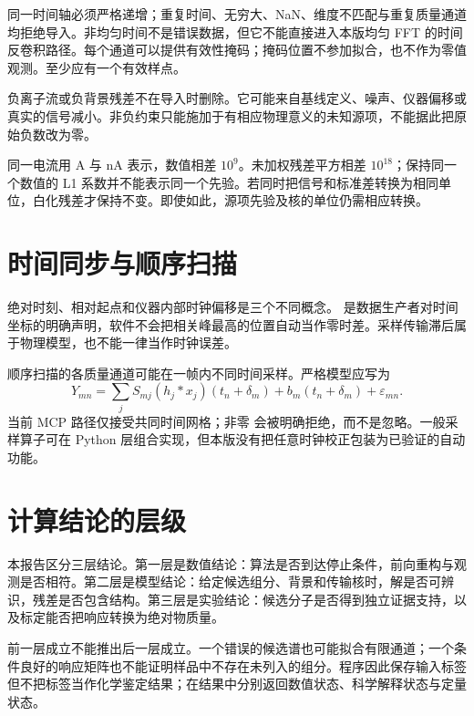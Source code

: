 同一时间轴必须严格递增；重复时间、无穷大、NaN、维度不匹配与重复质量通道均拒绝导入。非均匀时间不是错误数据，但它不能直接进入本版均匀 FFT 的时间反卷积路径。每个通道可以提供有效性掩码；掩码位置不参加拟合，也不作为零值观测。至少应有一个有效样点。

负离子流或负背景残差不在导入时删除。它可能来自基线定义、噪声、仪器偏移或真实的信号减小。非负约束只能施加于有相应物理意义的未知源项，不能据此把原始负数改为零。

\begin{example}[单位错误对正则化的影响]
同一电流用 A 与 nA 表示，数值相差 $10^9$。未加权残差平方相差 $10^{18}$；保持同一个数值的 L1 系数并不能表示同一个先验。若同时把信号和标准差转换为相同单位，白化残差才保持不变。即使如此，源项先验及核的单位仍需相应转换。
\end{example}

\section{时间同步与顺序扫描}
绝对时刻、相对起点和仪器内部时钟偏移是三个不同概念。 是数据生产者对时间坐标的明确声明，软件不会把相关峰最高的位置自动当作零时差。采样传输滞后属于物理模型，也不能一律当作时钟误差。

顺序扫描的各质量通道可能在一帧内不同时间采样。严格模型应写为
\begin{equation}
Y_{mn}=\sum_jS_{mj}(h_j*x_j)(t_n+\delta_m)+b_m(t_n+\delta_m)+\varepsilon_{mn}.
\end{equation}
当前 MCP 路径仅接受共同时间网格；非零  会被明确拒绝，而不是忽略。一般采样算子可在 Python 层组合实现，但本版没有把任意时钟校正包装为已验证的自动功能。

\section{计算结论的层级}
本报告区分三层结论。第一层是数值结论：算法是否到达停止条件，前向重构与观测是否相符。第二层是模型结论：给定候选组分、背景和传输核时，解是否可辨识，残差是否包含结构。第三层是实验结论：候选分子是否得到独立证据支持，以及标定能否把响应转换为绝对物质量。

前一层成立不能推出后一层成立。一个错误的候选谱也可能拟合有限通道；一个条件良好的响应矩阵也不能证明样品中不存在未列入的组分。程序因此保存输入标签但不把标签当作化学鉴定结果；在结果中分别返回数值状态、科学解释状态与定量状态。
